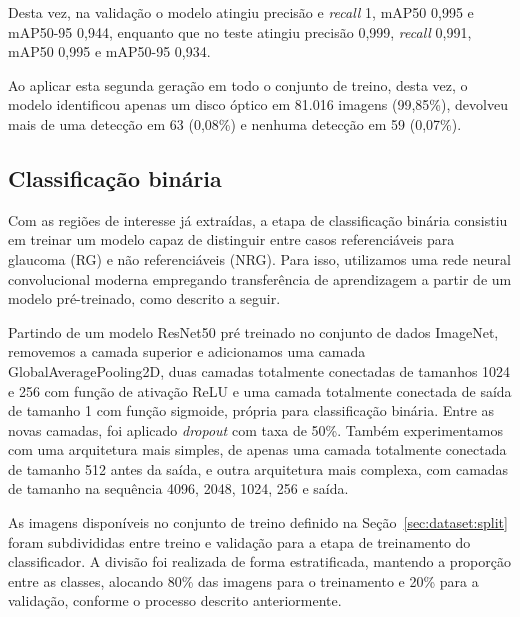 \documentclass[12pt]{article}
\begin{document}
Desta vez, na validação o modelo atingiu precisão e \emph{recall} 1, mAP50 0,995 e mAP50-95 0,944, enquanto que no teste atingiu precisão 0,999, \emph{recall} 0,991, mAP50 0,995 e mAP50-95 0,934.

Ao aplicar esta segunda geração em todo o conjunto de treino, desta vez, o modelo identificou apenas um disco óptico em 81.016 imagens (99,85\%), devolveu mais de uma detecção em 63 (0,08\%) e nenhuma detecção em 59 (0,07\%).



\subsection{Classificação binária}
\label{sec:binary_classification}

Com as regiões de interesse já extraídas, a etapa de classificação binária consistiu em treinar um modelo capaz de distinguir entre casos referenciáveis para glaucoma (RG) e não referenciáveis (NRG). Para isso, utilizamos uma rede neural convolucional moderna empregando transferência de aprendizagem a partir de um modelo pré-treinado, como descrito a seguir.

Partindo de um modelo ResNet50 pré treinado no conjunto de dados ImageNet, removemos a camada superior e adicionamos uma camada GlobalAveragePooling2D, duas camadas totalmente conectadas de tamanhos 1024 e 256 com função de ativação ReLU e uma camada totalmente conectada de saída de tamanho 1 com função sigmoide, própria para classificação binária. Entre as novas camadas, foi aplicado \emph{dropout} com taxa de 50\%. Também experimentamos com uma arquitetura mais simples, de apenas uma camada totalmente conectada de tamanho 512 antes da saída, e outra arquitetura mais complexa, com camadas de tamanho na sequência 4096, 2048, 1024, 256 e saída.


As imagens disponíveis no conjunto de treino definido na Seção~\ref{sec:dataset:split} foram subdivididas entre treino e validação para a etapa de treinamento do classificador. A divisão foi realizada de forma estratificada, mantendo a proporção entre as classes, alocando 80\% das imagens para o treinamento e 20\% para a validação, conforme o processo descrito anteriormente.
\end{document}
